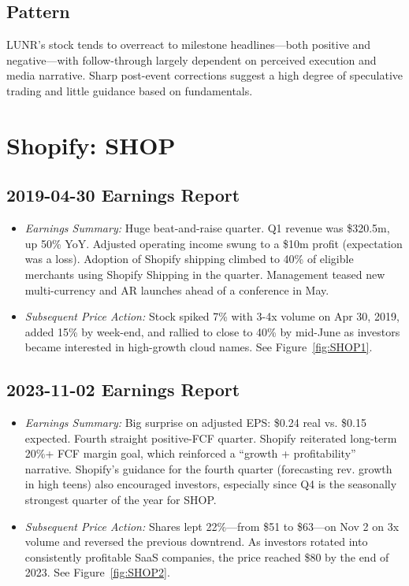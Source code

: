 \documentclass[11pt]{article}
\begin{document}
        \subsection{Pattern}
        LUNR’s stock tends to overreact to milestone headlines—both positive and negative—with follow-through largely dependent on perceived execution and media narrative. Sharp post-event corrections suggest a high degree of speculative trading and little guidance based on fundamentals.
\section{Shopify: SHOP}
    \subsection{2019-04-30 Earnings Report} 
        \begin{itemize}
            \item \textit{Earnings Summary:} Huge beat-and-raise quarter. Q1 revenue was \$320.5m, up 50\% YoY. Adjusted operating income swung to a \$10m profit (expectation was a loss). Adoption of Shopify shipping climbed to 40\% of eligible merchants using Shopify Shipping in the quarter. Management teased new multi-currency and AR launches ahead of a conference in May.
            \item \textit{Subsequent Price Action:} Stock spiked 7\% with 3-4x volume on Apr 30, 2019, added 15\% by week-end, and rallied to close to 40\% by mid-June as investors became interested in high-growth cloud names. See Figure~\ref{fig:SHOP1}.
        \end{itemize}
    \subsection{2023-11-02 Earnings Report} 
        \begin{itemize}
            \item \textit{Earnings Summary:} Big surprise on adjusted EPS: \$0.24 real vs. \$0.15 expected. Fourth straight positive-FCF quarter. Shopify reiterated long-term 20\%+ FCF margin goal, which reinforced a ``growth + profitability'' narrative. Shopify's guidance for the fourth quarter (forecasting rev. growth in high teens) also encouraged investors, especially since Q4 is the seasonally strongest quarter of the year for SHOP.
            \item \textit{Subsequent Price Action:} Shares lept 22\%---from \$51 to \$63---on Nov 2 on 3x volume and reversed the previous downtrend. As investors rotated into consistently profitable SaaS companies, the price reached \$80 by the end of 2023. See Figure~\ref{fig:SHOP2}.
        \end{itemize}
\end{document}
